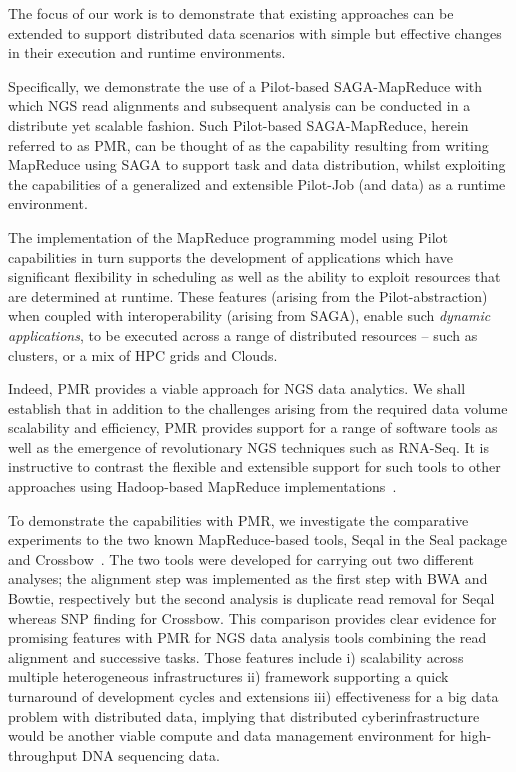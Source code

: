 \documentclass{acm_proc_article-sp}
\begin{document}
The focus of our work is to demonstrate that existing approaches can
be extended to support distributed data scenarios with simple but
effective changes in their execution and runtime environments.

Specifically, we demonstrate the use of a Pilot-based SAGA-MapReduce
with which NGS read alignments and subsequent analysis can be
conducted in a distribute yet scalable fashion. Such Pilot-based
SAGA-MapReduce, herein referred to as PMR, can be thought of as the
capability resulting from writing MapReduce using SAGA to support task
and data distribution, whilst exploiting the capabilities of a
generalized and extensible Pilot-Job (and data) as a runtime
environment\cite{Sehgal2011590,pmr2012,pstar11}.

The implementation of the MapReduce programming model using Pilot
capabilities in turn supports the development of applications which
have significant flexibility in scheduling as well as the ability to
exploit resources that are determined at runtime.  These features
(arising from the Pilot-abstraction) when coupled with
interoperability (arising from SAGA), enable such {\it dynamic
  applications}, to be executed across a range of distributed
resources -- such as clusters, or a mix of HPC grids and Clouds.

Indeed, PMR provides a viable approach for NGS data analytics.  We
shall establish that in addition to the challenges arising from the
required data volume scalability and efficiency, PMR provides support
for a range of software tools as well as the emergence of
revolutionary NGS techniques such as RNA-Seq.  It is instructive to
contrast the flexible and extensible support for such tools to other
approaches using Hadoop-based MapReduce
implementations~\cite{cloudburst,langmead2009,seal2011,langmead2010}.

To demonstrate the capabilities with PMR, we investigate the
comparative experiments to the two known MapReduce-based tools, Seqal
in the Seal package and Crossbow~\cite{seal2011,langmead2010}.  The
two tools were developed for carrying out two different analyses; the
alignment step was implemented as the first step with BWA and Bowtie,
respectively but the second analysis is duplicate read removal for
Seqal whereas SNP finding for Crossbow.  This comparison provides
clear evidence for promising features with PMR for NGS data analysis
tools combining the read alignment and successive tasks.  Those
features include i) scalability across multiple heterogeneous
infrastructures ii) framework supporting a quick turnaround of
development cycles and extensions iii) effectiveness for a big data
problem with distributed data, implying that distributed
cyberinfrastructure would be another viable compute and data
management environment for high-throughput DNA sequencing data.
\end{document}
